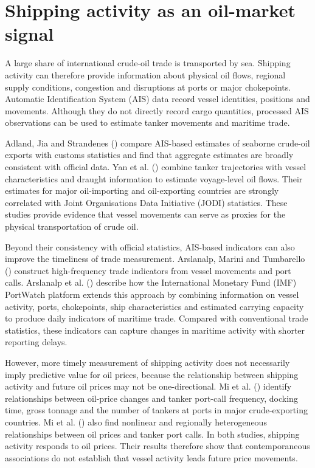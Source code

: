 \documentclass[
  british,
  12pt,
  oneside]{book}
\begin{document}
\section{Shipping activity as an oil-market signal}\label{lit-shipping}

A large share of international crude-oil trade is transported by sea. Shipping activity can therefore provide information about physical oil flows, regional supply conditions, congestion and disruptions at ports or major chokepoints. Automatic Identification System (AIS) data record vessel identities, positions and movements. Although they do not directly record cargo quantities, processed AIS observations can be used to estimate tanker movements and maritime trade.

Adland, Jia and Strandenes () compare AIS-based estimates of seaborne crude-oil exports with customs statistics and find that aggregate estimates are broadly consistent with official data. Yan et al. () combine tanker trajectories with vessel characteristics and draught information to estimate voyage-level oil flows. Their estimates for major oil-importing and oil-exporting countries are strongly correlated with Joint Organisations Data Initiative (JODI) statistics. These studies provide evidence that vessel movements can serve as proxies for the physical transportation of crude oil.

Beyond their consistency with official statistics, AIS-based indicators can also improve the timeliness of trade measurement. Arslanalp, Marini and Tumbarello () construct high-frequency trade indicators from vessel movements and port calls. Arslanalp et al. () describe how the International Monetary Fund (IMF) PortWatch platform extends this approach by combining information on vessel activity, ports, chokepoints, ship characteristics and estimated carrying capacity to produce daily indicators of maritime trade. Compared with conventional trade statistics, these indicators can capture changes in maritime activity with shorter reporting delays.

However, more timely measurement of shipping activity does not necessarily imply predictive value for oil prices, because the relationship between shipping activity and future oil prices may not be one-directional. Mi et al. () identify relationships between oil-price changes and tanker port-call frequency, docking time, gross tonnage and the number of tankers at ports in major crude-exporting countries. Mi et al. () also find nonlinear and regionally heterogeneous relationships between oil prices and tanker port calls. In both studies, shipping activity responds to oil prices. Their results therefore show that contemporaneous associations do not establish that vessel activity leads future price movements.
\end{document}
